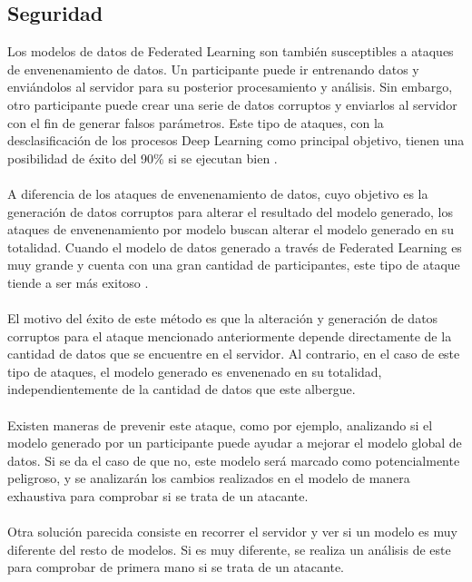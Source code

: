 \subsection{Seguridad}
Los modelos de datos de Federated Learning son también susceptibles a ataques de envenenamiento de datos. Un participante puede ir entrenando datos y enviándolos al servidor para su posterior procesamiento y análisis. Sin embargo, otro participante puede crear una serie de datos corruptos y enviarlos al servidor con el fin de generar falsos parámetros. Este tipo de ataques, con la desclasificación de los procesos Deep Learning como principal objetivo, tienen una posibilidad de éxito del 90\% si se ejecutan bien \autocite{armknechtGuideFullyHomomorphic2015}.
\\ \\
A diferencia de los ataques de envenenamiento de datos, cuyo objetivo es la generación de datos corruptos para alterar el resultado del modelo generado, los ataques de envenenamiento por modelo buscan alterar el modelo generado en su totalidad. Cuando el modelo de datos generado a través de Federated Learning es muy grande y cuenta con una gran cantidad de participantes, este tipo de ataque tiende a ser más exitoso \autocite{bhagoji2019analyzing}.
\\ \\
El motivo del éxito de este método es que la alteración y generación de datos corruptos para el ataque mencionado anteriormente depende directamente de la cantidad de datos que se encuentre en el servidor. Al contrario, en el caso de este tipo de ataques, el modelo generado es envenenado en su totalidad, independientemente de la cantidad de datos que este albergue.
\\ \\
Existen maneras de prevenir este ataque, como por ejemplo, analizando si el modelo generado por un participante puede ayudar a mejorar el modelo global de datos. Si se da el caso de que no, este modelo será marcado como potencialmente peligroso, y se analizarán los cambios realizados en el modelo de manera exhaustiva para comprobar si se trata de un atacante. 
\\ \\ 
Otra solución parecida consiste en recorrer el servidor y ver si un modelo es muy diferente del resto de modelos. Si es muy diferente, se realiza un análisis de este para comprobar de primera mano si se trata de un atacante.